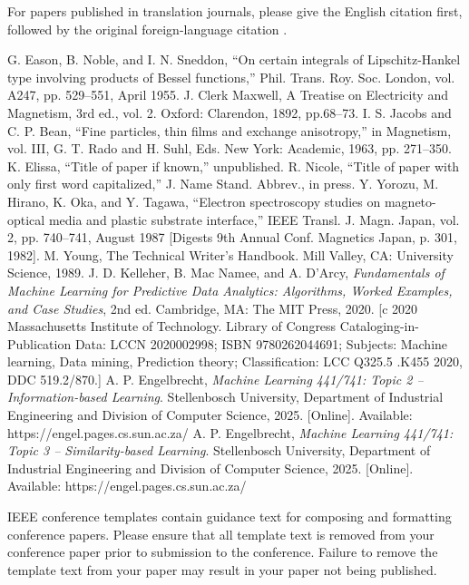 \documentclass[conference]{IEEEtran}
\begin{document}
For papers published in translation journals, please give the English 
citation first, followed by the original foreign-language citation \cite{b6}.

\begin{thebibliography}{00}
 G. Eason, B. Noble, and I. N. Sneddon, ``On certain integrals of Lipschitz-Hankel type involving products of Bessel functions,'' Phil. Trans. Roy. Soc. London, vol. A247, pp. 529--551, April 1955.
 J. Clerk Maxwell, A Treatise on Electricity and Magnetism, 3rd ed., vol. 2. Oxford: Clarendon, 1892, pp.68--73.
 I. S. Jacobs and C. P. Bean, ``Fine particles, thin films and exchange anisotropy,'' in Magnetism, vol. III, G. T. Rado and H. Suhl, Eds. New York: Academic, 1963, pp. 271--350.
 K. Elissa, ``Title of paper if known,'' unpublished.
 R. Nicole, ``Title of paper with only first word capitalized,'' J. Name Stand. Abbrev., in press.
 Y. Yorozu, M. Hirano, K. Oka, and Y. Tagawa, ``Electron spectroscopy studies on magneto-optical media and plastic substrate interface,'' IEEE Transl. J. Magn. Japan, vol. 2, pp. 740--741, August 1987 [Digests 9th Annual Conf. Magnetics Japan, p. 301, 1982].
 M. Young, The Technical Writer's Handbook. Mill Valley, CA: University Science, 1989.
 J. D. Kelleher, B. Mac Namee, and A. D’Arcy, \textit{Fundamentals of Machine Learning for Predictive Data Analytics: Algorithms, Worked Examples, and Case Studies}, 2nd ed. Cambridge, MA: The MIT Press, 2020. [c 2020 Massachusetts Institute of Technology. Library of Congress Cataloging-in-Publication Data: LCCN 2020002998; ISBN 9780262044691; Subjects: Machine learning, Data mining, Prediction theory; Classification: LCC Q325.5 .K455 2020, DDC 519.2/870.]
 A. P. Engelbrecht, \textit{Machine Learning 441/741: Topic 2 -- Information-based Learning}. Stellenbosch University, Department of Industrial Engineering and Division of Computer Science, 2025. [Online]. Available: https://engel.pages.cs.sun.ac.za/
 A. P. Engelbrecht, \textit{Machine Learning 441/741: Topic 3 -- Similarity-based Learning}. Stellenbosch University, Department of Industrial Engineering and Division of Computer Science, 2025. [Online]. Available: https://engel.pages.cs.sun.ac.za/


\end{thebibliography}
\vspace{12pt}
\color{red}
IEEE conference templates contain guidance text for composing and formatting conference papers. Please ensure that all template text is removed from your conference paper prior to submission to the conference. Failure to remove the template text from your paper may result in your paper not being published.
\end{document}
